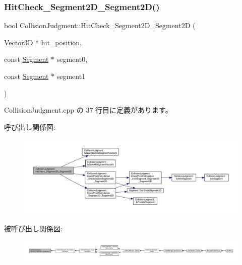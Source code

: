 \subsubsection{\texorpdfstring{Hit\+Check\+\_\+\+Segment2\+D\+\_\+\+Segment2\+D()}{HitCheck\_Segment2D\_Segment2D()}}
{\footnotesize\ttfamily bool Collision\+Judgment\+::\+Hit\+Check\+\_\+\+Segment2\+D\+\_\+\+Segment2D (\begin{DoxyParamCaption}\item[{\mbox{\hyperlink{class_vector3_d}{Vector3D}} $\ast$}]{hit\+\_\+position,  }\item[{const \mbox{\hyperlink{class_segment}{Segment}} $\ast$}]{segment0,  }\item[{const \mbox{\hyperlink{class_segment}{Segment}} $\ast$}]{segment1 }\end{DoxyParamCaption})\hspace{0.3cm}{\ttfamily [static]}}



 Collision\+Judgment.\+cpp の 37 行目に定義があります。

呼び出し関係図\+:\nopagebreak
\begin{figure}[H]
\begin{center}
\leavevmode
\includegraphics[width=350pt]{class_collision_judgment_a612bc9e5cfcb243324417f5059c6e24d_cgraph}
\end{center}
\end{figure}
被呼び出し関係図\+:
\nopagebreak
\begin{figure}[H]
\begin{center}
\leavevmode
\includegraphics[width=350pt]{class_collision_judgment_a612bc9e5cfcb243324417f5059c6e24d_icgraph}
\end{center}
\end{figure}
\mbox{\label{class_collision_judgment_a21938f544146999d01d96f855277727b}} 
